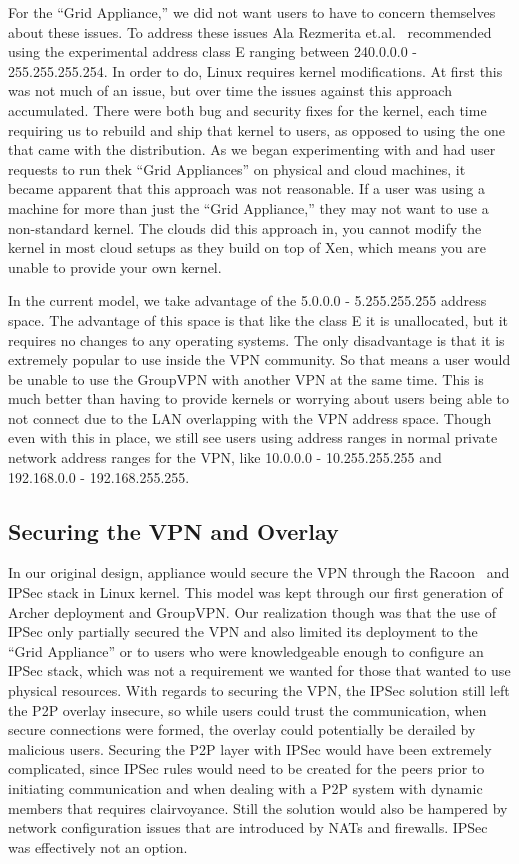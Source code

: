 \documentclass[conference]{IEEEtran}
\begin{document}
For the ``Grid Appliance,'' we did not want users to have to concern themselves
about these issues.  To address these issues Ala Rezmerita et.al.~\cite{pvc}
recommended using the experimental address class E ranging between 240.0.0.0 -
255.255.255.254.  In order to do, Linux requires kernel modifications.  At
first this was not much of an issue, but over time the issues against this
approach accumulated.  There were both bug and security fixes for the kernel,
each time requiring us to rebuild and ship that kernel to users, as opposed to
using the one that came with the distribution.  As we began experimenting with
and had user requests to run thek ``Grid Appliances'' on physical and cloud
machines, it became apparent that this approach was not reasonable.  If a user
was using a machine for more than just the ``Grid Appliance,'' they may not
want to use a non-standard kernel.  The clouds did this approach in, you cannot
modify the kernel in most cloud setups as they build on top of Xen, which means
you are unable to provide your own kernel.

In the current model, we take advantage of the 5.0.0.0 - 5.255.255.255 address
space.  The advantage of this space is that like the class E it is unallocated,
but it requires no changes to any operating systems.  The only disadvantage is
that it is extremely popular to use inside the VPN community.  So that means a
user would be unable to use the GroupVPN with another VPN at the same time.
This is much better than having to provide kernels or worrying about users
being able to not connect due to the LAN overlapping with the VPN address
space.  Though even with this in place, we still see users using address ranges
in normal private network address ranges for the VPN, like 10.0.0.0 -
10.255.255.255 and 192.168.0.0 - 192.168.255.255.

\subsection{Securing the VPN and Overlay}

In our original design, appliance would secure the VPN through the
Racoon~\cite{racoon} and IPSec stack in Linux kernel.  This model was kept
through our first generation of Archer deployment and GroupVPN.  Our
realization though was that the use of IPSec only partially secured the VPN and
also limited its deployment to the ``Grid Appliance'' or to users who were
knowledgeable enough to configure an IPSec stack, which was not a requirement
we wanted for those that wanted to use physical resources.  With regards to
securing the VPN, the IPSec solution still left the P2P overlay insecure, so
while users could trust the communication, when secure connections were formed,
the overlay could potentially be derailed by malicious users.  Securing the P2P
layer with IPSec would have been extremely complicated, since IPSec rules would
need to be created for the peers prior to initiating communication and when
dealing with a P2P system with dynamic members that requires clairvoyance.
Still the solution would also be hampered by network configuration issues that
are introduced by NATs and firewalls.  IPSec was effectively not an option.
\end{document}
